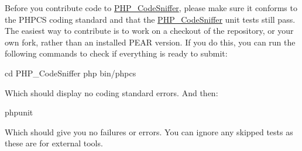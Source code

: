 Before you contribute code to \mbox{\hyperlink{namespace_p_h_p___code_sniffer}{PHP\+\_\+\+Code\+Sniffer}}, please make sure it conforms to the PHPCS coding standard and that the \mbox{\hyperlink{namespace_p_h_p___code_sniffer}{PHP\+\_\+\+Code\+Sniffer}} unit tests still pass. The easiest way to contribute is to work on a checkout of the repository, or your own fork, rather than an installed PEAR version. If you do this, you can run the following commands to check if everything is ready to submit\+: \begin{DoxyVerb}cd PHP_CodeSniffer
php bin/phpcs
\end{DoxyVerb}
 Which should display no coding standard errors. And then\+: \begin{DoxyVerb}phpunit
\end{DoxyVerb}
 Which should give you no failures or errors. You can ignore any skipped tests as these are for external tools. 